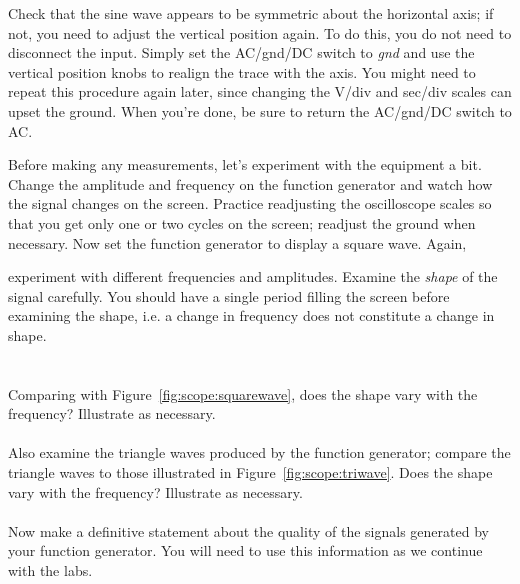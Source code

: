 \noindent Check that the sine wave appears to be symmetric about the
horizontal axis; if
not, you need to adjust the vertical position again.  To do this, you do not need to 
disconnect the input. Simply set the AC/gnd/DC switch to {\it gnd} and use the
vertical position knobs to realign the trace with the axis.  You might need
to repeat this procedure again later, since changing the V/div and sec/div
scales can upset the ground. When you're done, be sure to return the AC/gnd/DC 
switch to AC.

\noindent Before making any measurements, let's experiment with the equipment a bit.
Change the amplitude and frequency on the function generator and watch how
the signal changes on the screen. Practice readjusting the oscilloscope scales
so that you get only one or two cycles on the screen; readjust the ground when 
necessary.  Now set the function generator to display a square wave.  Again,

experiment with different frequencies and amplitudes. Examine the {\it shape}
of the signal carefully.  You should have a single period filling the screen
before examining the shape, i.e. a change in frequency does not constitute a 
change in shape. \\

  \\
\ \\
 \hspace*{0.5cm} Comparing with 
Figure~\ref{fig:scope:squarewave}, does the shape vary with the frequency?
Illustrate as necessary. \\
\vspace*{2cm} \\  
 \hspace*{0.5cm}Also examine the triangle waves produced by the
function generator; compare the triangle waves to those illustrated in
Figure~\ref{fig:scope:triwave}.  Does the shape vary with the frequency?
Illustrate as necessary. \\
\vspace*{2cm} \\   
 \hspace*{0.5cm}  Now make a definitive statement
about the quality of the signals generated by your function generator.  You
will need to use this information as we continue with the labs. \\  

